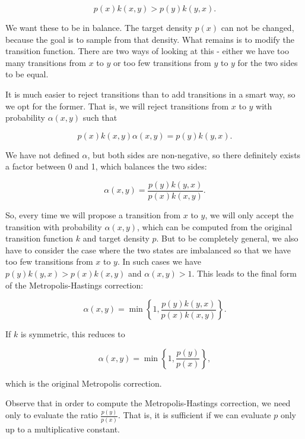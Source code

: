 \documentclass{book}
\theoremstyle{plain}%
\theoremstyle{definition}
\begin{document}
$$p(x)k(x,y) > p(y)k(y,x).$$

We want these to be in balance. The target density $p(x)$ can not be changed, because the goal is to sample from that density. What remains is to modify the transition function. There are two ways of looking at this - either we have too many transitions from $x$ to $y$ or too few transitions from $y$ to $y$ for the two sides to be equal.

It is much easier to reject transitions than to add transitions in a smart way, so we opt for the former. That is, we will reject transitions from $x$ to $y$ with probability $\alpha(x,y)$ such that

$$p(x)k(x,y)\alpha(x,y) = p(y)k(y,x).$$

We have not defined $\alpha$, but both sides are non-negative, so there definitely exists a factor between 0 and 1, which balances the two sides:

$$\alpha(x,y) = \frac{p(y)k(y,x)}{p(x)k(x,y)}.$$

So, every time we will propose a transition from $x$ to $y$, we will only accept the transition with probability $\alpha(x,y)$, which can be computed from the original transition function $k$ and target density $p$. But to be completely general, we also have to consider the case where the two states are imbalanced so that we have too few transitions from $x$ to $y$. In such cases we have $p(y)k(y,x) > p(x)k(x,y)$ and $\alpha(x,y) > 1$. This leads to the final form of the Metropolis-Hastings correction:

$$\alpha(x,y) = \min \left\lbrace 1, \frac{p(y)k(y,x)}{p(x)k(x,y)}\right\rbrace.$$

If $k$ is symmetric, this reduces to

$$\alpha(x,y) = \min\left\lbrace 1, \frac{p(y)}{p(x)}\right\rbrace,$$

which is the original Metropolis correction.

Observe that in order to compute the Metropolis-Hastings correction, we need only to evaluate the ratio $\frac{p(y)}{p(x)}$. That is, it is sufficient if we can evaluate $p$ only up to a multiplicative constant.
\end{document}
